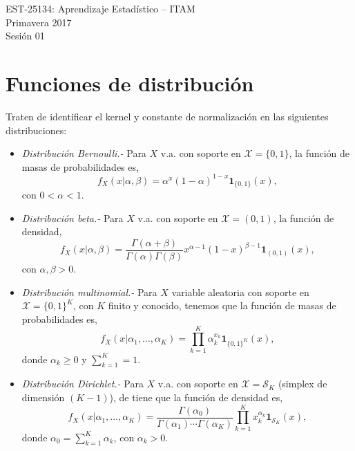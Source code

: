 \documentclass[11pt]{article}
\begin{document}
\begin{center}
{\sc EST-25134: Aprendizaje Estad\'istico} -- ITAM\\
\vspace{0.1cm}
Primavera 2017\\
\vspace{0.1cm}
Sesi\'on 01
\end{center}


\def\dsp{\def\baselinestretch{0.7}\large\normalsize}\dsp

%
%
\section*{\normalsize Funciones de distribuci\'on}
\noindent
Traten de identificar el kernel y constante de normalizaci\'on en las siguientes distribuciones:
\begin{itemize}
	\item {\it Distribuci\'on Bernoulli.-} Para $X$ v.a. con soporte en $\mathcal{X}=\{0,1\}$, la funci\'on de masas de probabilidades es,
	\begin{equation}
	f_X(x|\alpha,\beta)=\alpha^{x}(1-\alpha)^{1-x}\boldsymbol{1}_{\{0,1\}}(x),
	\end{equation}
	con $0<\alpha<1$.
	\item {\it Distribuci\'on beta.-} Para $X$ v.a. con soporte en $\mathcal{X}=(0,1)$, la funci\'on de densidad,
		\begin{equation}
		 f_X(x|\alpha,\beta)=\frac{\Gamma(\alpha+\beta)}{\Gamma(\alpha)\Gamma(\beta)}
		 x^{\alpha-1}(1-x)^{\beta-1}\boldsymbol{1}_{(0,1)}(x),
		\end{equation}
	con $\alpha,\beta > 0$.
	\item {\it Distribuci\'on multinomial.-} Para $X$ variable aleatoria con soporte en $\mathcal{X}=\{0,1\}^K$, con $K$ finito y conocido, tenemos que la funci\'on de masas de probabilidades es,
		\begin{equation}
		f_X(x|\alpha_1,\ldots,\alpha_K)=\prod_{k=1}^{K}\alpha_k^{x_k}\boldsymbol{1}_{\{0,1\}^K}(x),
		\end{equation}
		donde $\alpha_k \geq 0$ y $\sum_{k=1}^{K}=1$.
	\item {\it Distribuci\'on Dirichlet.-} Para $X$ v.a. con soporte en $\mathcal{X}=\mathcal{S}_K$ (simplex de dimensi\'on $(K-1)$), de tiene que la funci\'on de densidad es,
		\begin{equation}
		f_X(x|\alpha_1,\ldots,\alpha_K)=\frac{\Gamma(\alpha_0)}{\Gamma(\alpha_1)\cdots \Gamma(\alpha_K)}
		\prod_{k=1}^{K}x_k^{\alpha_k}\boldsymbol{1}_{\mathcal{S}_K}(x),
		\end{equation}
		donde $\alpha_0=\sum_{k=1}^{K}\alpha_k$, con $\alpha_k > 0$.
\end{itemize}


\end{document}

